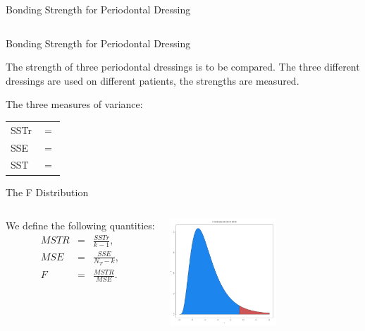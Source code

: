 \begin{frame}{Bonding Strength for Periodontal Dressing}
\begin{columns}
  \end{columns}

\end{frame}

\begin{frame}{Bonding Strength for Periodontal Dressing}

  The strength of three periodontal dressings is to be compared. The
  three different dressings are used on different patients, the
  strengths are measured.

  The three measures of variance: \\
  \begin{tabular}{ll}
    SSTr & $=$ \\
    SSE  & $=$ \\
    SST  & $=$  
  \end{tabular}


\end{frame}

\begin{frame}{The F Distribution}

  \begin{columns}

    We define the following quantities:
    \begin{eqnarray*}
      MSTR & = & \frac{SSTr}{k-1}, \\
      MSE  & = & \frac{SSE}{N_T - k}, \\
      F    & = & \frac{MSTR}{MSE}.
    \end{eqnarray*}

  \vfill


    \vfill

    \centerline{\includegraphics[width=4cm]{img/FDistribution}}

    \vfill

    \end{columns}
  
\end{frame}



